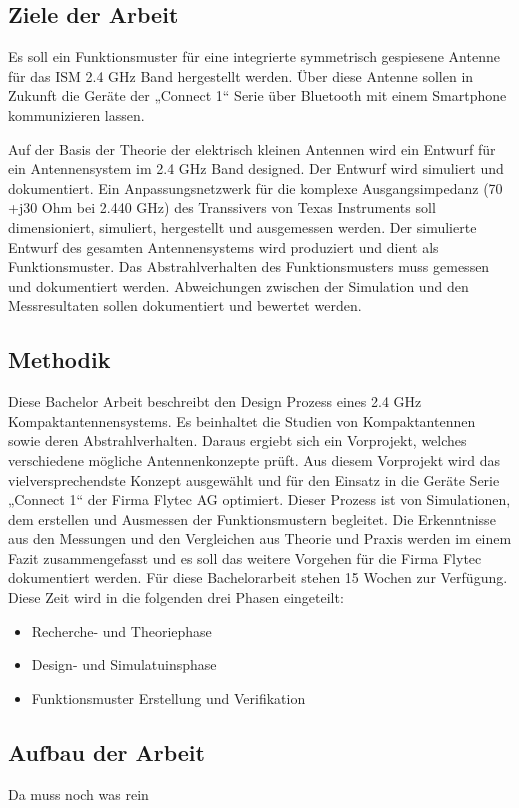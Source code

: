 \subsection{Ziele der Arbeit}
Es soll ein Funktionsmuster für eine integrierte symmetrisch gespiesene Antenne für das ISM 2.4 GHz Band hergestellt werden. Über diese Antenne sollen in Zukunft die Geräte der „Connect 1“ Serie über Bluetooth mit einem Smartphone kommunizieren lassen. 

Auf der Basis der Theorie der elektrisch kleinen Antennen wird ein Entwurf für ein Antennensystem im 2.4 GHz Band designed. Der Entwurf wird simuliert und dokumentiert. 
Ein Anpassungsnetzwerk  für die komplexe Ausgangsimpedanz (70 +j30 Ohm bei 2.440 GHz) des Transsivers von Texas Instruments soll dimensioniert, simuliert, hergestellt und ausgemessen werden.
Der simulierte Entwurf des gesamten Antennensystems wird produziert und dient als Funktionsmuster. Das Abstrahlverhalten des Funktionsmusters muss gemessen und dokumentiert werden.
Abweichungen zwischen der Simulation und den Messresultaten sollen dokumentiert und bewertet werden.
\subsection{Methodik}
Diese Bachelor Arbeit beschreibt den Design Prozess eines 2.4 GHz Kompaktantennensystems. Es beinhaltet die Studien von Kompaktantennen sowie deren Abstrahlverhalten. Daraus ergiebt sich ein  Vorprojekt, welches verschiedene mögliche Antennenkonzepte prüft. Aus diesem Vorprojekt wird das vielversprechendste Konzept ausgewählt und für den Einsatz in die Geräte Serie „Connect 1“ der Firma Flytec AG optimiert. Dieser Prozess ist von Simulationen, dem  erstellen und Ausmessen der Funktionsmustern begleitet. Die Erkenntnisse aus den Messungen und den Vergleichen aus Theorie und Praxis werden im einem Fazit zusammengefasst und es soll das weitere Vorgehen für die Firma Flytec dokumentiert werden. Für diese Bachelorarbeit stehen 15 Wochen zur Verfügung. Diese Zeit wird in die folgenden drei Phasen eingeteilt:
\begin{itemize}
	\item Recherche- und Theoriephase
	\item Design- und Simulatuinsphase 
	\item Funktionsmuster Erstellung und Verifikation
\end{itemize}

\subsection{Aufbau der Arbeit}
Da muss noch was rein




